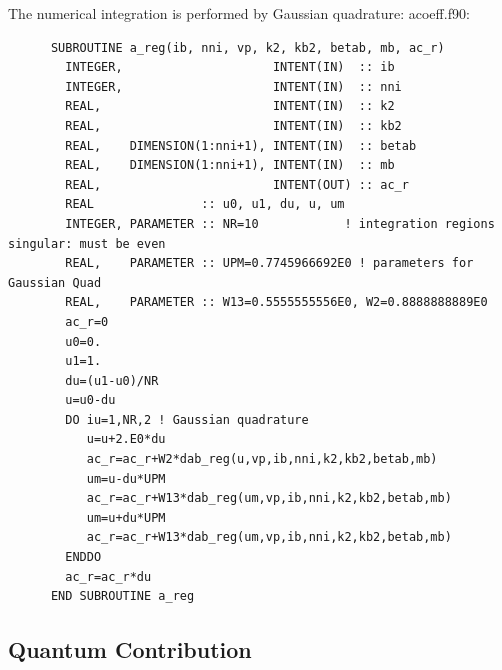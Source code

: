 \documentclass[preprint,12pt,eqsecnum,nofootinbib,amsmath,amssymb]{revtex4}
\begin{document}
\noindent
The numerical integration is performed by Gaussian quadrature:
\vskip0.4cm
\noindent
acoeff.f90:
{
\baselineskip 10pt
\begin{verbatim}
      SUBROUTINE a_reg(ib, nni, vp, k2, kb2, betab, mb, ac_r)
        INTEGER,                     INTENT(IN)  :: ib
        INTEGER,                     INTENT(IN)  :: nni 
        REAL,                        INTENT(IN)  :: k2
        REAL,                        INTENT(IN)  :: kb2
        REAL,    DIMENSION(1:nni+1), INTENT(IN)  :: betab
        REAL,    DIMENSION(1:nni+1), INTENT(IN)  :: mb
        REAL,                        INTENT(OUT) :: ac_r
        REAL               :: u0, u1, du, u, um
        INTEGER, PARAMETER :: NR=10            ! integration regions singular: must be even
        REAL,    PARAMETER :: UPM=0.7745966692E0 ! parameters for Gaussian Quad
        REAL,    PARAMETER :: W13=0.5555555556E0, W2=0.8888888889E0
        ac_r=0
        u0=0.
        u1=1.
        du=(u1-u0)/NR
        u=u0-du
        DO iu=1,NR,2 ! Gaussian quadrature
           u=u+2.E0*du
           ac_r=ac_r+W2*dab_reg(u,vp,ib,nni,k2,kb2,betab,mb)
           um=u-du*UPM
           ac_r=ac_r+W13*dab_reg(um,vp,ib,nni,k2,kb2,betab,mb)
           um=u+du*UPM
           ac_r=ac_r+W13*dab_reg(um,vp,ib,nni,k2,kb2,betab,mb)
        ENDDO
        ac_r=ac_r*du
      END SUBROUTINE a_reg
\end{verbatim}
}


\subsection{Quantum Contribution}
\end{document}

